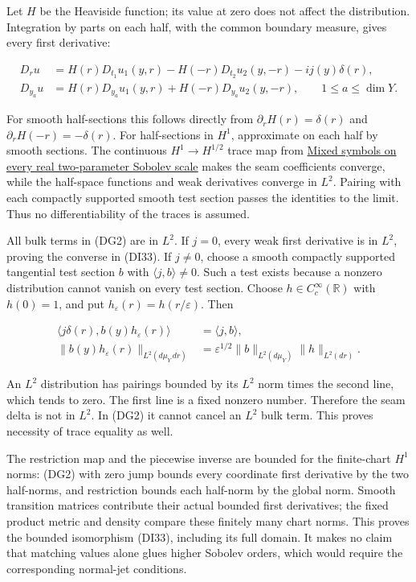\documentclass[
  11pt,
]{article}
\begin{document}
Let \(H\) be the Heaviside function; its value at zero does not affect
the distribution. Integration by parts on each half, with the common
boundary measure, gives every first derivative:

\[
 \begin{aligned}
 D_ru&=H(r)D_{t_1}u_1(y,r)
        -H(-r)D_{t_2}u_2(y,-r)-i j(y)\delta(r),\\
 D_{y_a}u&=H(r)D_{y_a}u_1(y,r)
               +H(-r)D_{y_a}u_2(y,-r),
       \qquad 1\leq a\leq\dim Y.
 \end{aligned}
 \tag{DG2}
\]

For smooth half-sections this follows directly from
\(\partial_rH(r)=\delta(r)\) and \(\partial_rH(-r)=-\delta(r)\). For
half-sections in \(H^1\), approximate on each half by smooth sections.
The continuous \(H^1\to H^{1/2}\) trace map from
\href{mixed-sobolev-mapping.pdf}{Mixed symbols on every real
two-parameter Sobolev scale} makes the seam coefficients converge, while
the half-space functions and weak derivatives converge in \(L^2\).
Pairing with each compactly supported smooth test section passes the
identities to the limit. Thus no differentiability of the traces is
assumed.

All bulk terms in (DG2) are in \(L^2\). If \(j=0\), every weak first
derivative is in \(L^2\), proving the converse in (DI33). If \(j\ne0\),
choose a smooth compactly supported tangential test section \(b\) with
\(\langle j,b\rangle\ne0\). Such a test exists because a nonzero
distribution cannot vanish on every test section. Choose
\(h\in C_c^\infty(\mathbb R)\) with \(h(0)=1\), and put
\(h_\varepsilon(r)=h(r/\varepsilon)\). Then

\[
 \begin{aligned}
 \langle j\delta(r),b(y)h_\varepsilon(r)\rangle
     &=\langle j,b\rangle,\\
 \|b(y)h_\varepsilon(r)\|_{L^2(d\mu_Y\,dr)}
     &=\varepsilon^{1/2}\|b\|_{L^2(d\mu_Y)}\|h\|_{L^2(dr)}.
 \end{aligned}
 \tag{DG3}
\]

An \(L^2\) distribution has pairings bounded by its \(L^2\) norm times
the second line, which tends to zero. The first line is a fixed nonzero
number. Therefore the seam delta is not in \(L^2\). In (DG2) it cannot
cancel an \(L^2\) bulk term. This proves necessity of trace equality as
well.

The restriction map and the piecewise inverse are bounded for the
finite-chart \(H^1\) norms: (DG2) with zero jump bounds every coordinate
first derivative by the two half-norms, and restriction bounds each
half-norm by the global norm. Smooth transition matrices contribute
their actual bounded first derivatives; the fixed product metric and
density compare these finitely many chart norms. This proves the bounded
isomorphism (DI33), including its full domain. It makes no claim that
matching values alone glues higher Sobolev orders, which would require
the corresponding normal-jet conditions.
\end{document}
